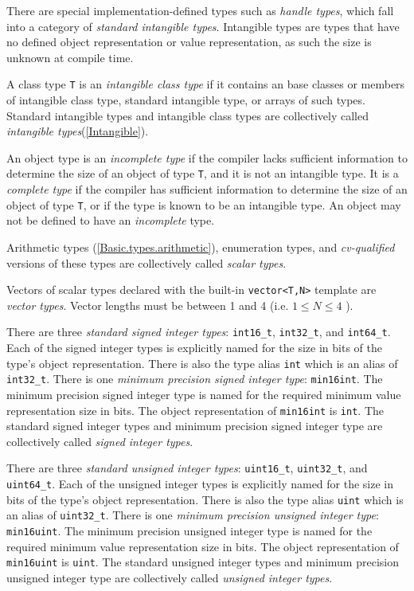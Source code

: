 \p There are special implementation-defined types such as \textit{handle types},
which fall into a category of \textit{standard intangible types}. Intangible
types are types that have no defined object representation or value
representation, as such the size is unknown at compile time.

\p A class type \texttt{T} is an \textit{intangible class type} if it contains
an base classes or members of intangible class type, standard intangible type,
or arrays of such types. Standard intangible types and intangible class types
are collectively called \textit{intangible types}(\ref{Intangible}).

\p An object type is an \textit{incomplete type} if the compiler lacks
sufficient information to determine the size of an object of type \texttt{T},
and it is not an intangible type. It is a \textit{complete type} if the compiler
has sufficient information to determine the size of an object of type
\texttt{T}, or if the type is known to be an intangible type. An object may not
be defined to have an \textit{incomplete} type.

\p Arithmetic types (\ref{Basic.types.arithmetic}), enumeration types, and
\textit{cv-qualified} versions of these types are collectively called
\textit{scalar types}.

\p Vectors of scalar types declared with the built-in \texttt{vector<T,N>}
template are \textit{vector types}. Vector lengths must be between 1 and 4 (i.e.
\( 1 \leq N \leq 4 \) ).


\p There are three \textit{standard signed integer types}: \texttt{int16\_t},
\texttt{int32\_t}, and \texttt{int64\_t}. Each of the signed integer types is
explicitly named for the size in bits of the type's object representation. There
is also the type alias \texttt{int} which is an alias of \texttt{int32\_t}.
There is one \textit{minimum precision signed integer type}: \texttt{min16int}.
The minimum precision signed integer type is named for the required minimum
value representation size in bits. The object representation of
\texttt{min16int} is \texttt{int}. The standard signed integer types and minimum
precision signed integer type are collectively called \textit{signed integer
types}.

\p There are three \textit{standard unsigned integer types}: \texttt{uint16\_t},
\texttt{uint32\_t}, and \texttt{uint64\_t}. Each of the unsigned integer types
is explicitly named for the size in bits of the type's object representation.
There is also the type alias \texttt{uint} which is an alias of
\texttt{uint32\_t}. There is one \textit{minimum precision unsigned integer
type}: \texttt{min16uint}. The minimum precision unsigned integer type is named
for the required minimum value representation size in bits. The object
representation of \texttt{min16uint} is \texttt{uint}. The standard unsigned
integer types and minimum precision unsigned integer type are collectively
called \textit{unsigned integer types}.

